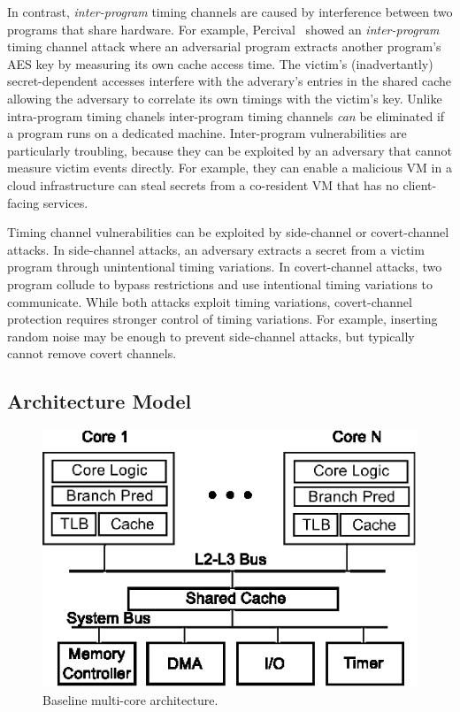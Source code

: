 In contrast, {\em inter-program} timing channels are caused by interference 
between two programs that share hardware.
For example, Percival~\cite{percival} showed an {\em inter-program} timing 
channel attack where an adversarial program extracts another program's AES key
by measuring its own cache access time. The victim's (inadvertantly)
secret-dependent accesses interfere with the adverary's entries in the shared
cache allowing the adversary to correlate its own timings with the victim's key. 
Unlike intra-program timing chanels inter-program timing channels {\em can} be
eliminated if a program runs on a dedicated machine. Inter-program 
vulnerabilities are particularly troubling, because they can be exploited by an 
adversary that cannot measure victim events directly. For example, they can 
enable a malicious VM in a cloud infrastructure can steal secrets from a
co-resident VM that has no client-facing services.

Timing channel vulnerabilities can be exploited by side-channel or 
covert-channel attacks. In side-channel attacks, an adversary extracts a secret from
a victim program through unintentional timing variations.
In covert-channel attacks, two program collude to bypass restrictions and use
intentional timing variations to communicate.
While both attacks exploit timing variations, covert-channel protection requires
stronger control of timing variations. For example, inserting random noise may be
enough to prevent side-channel attacks, but typically cannot remove covert channels.

\subsection{Architecture Model}


    \begin{figure}
        \begin{center}
            \includegraphics{figs/baseline.eps}
            \caption{Baseline multi-core architecture.}
            \label{fig:baseline}
        \end{center}
    \end{figure}

